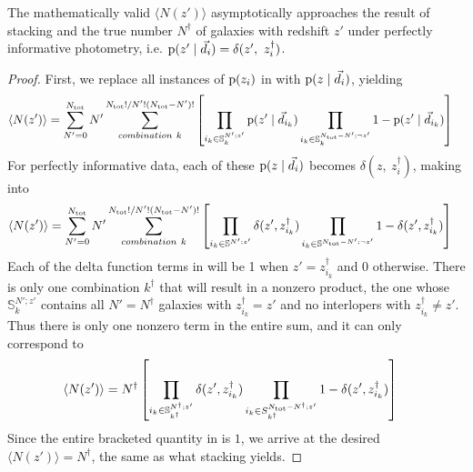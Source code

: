\begin{theorem}
	\label{thm:informative}
	The mathematically valid $\langle N(z') \rangle$ asymptotically approaches the result of stacking and the true number $N^{\dagger}$ of galaxies with redshift $z'$ under perfectly informative photometry, i.e. $\pr{z' \gvn \data_{i}} = \delta(z',\ z^{\dagger}_{i})$.
\end{theorem}
\begin{proof}
	First, we replace all instances of $\mathrm{p}(z_{i})$ in  with $\mathrm{p}(z \mid \vec{d}_{i})$, yielding
	\begin{align}
	\eqlabel{eqn:proofwithdata1}
	\langle N(z') \rangle &= \sum_{N' = 0}^{\ntot} N' \sum_{combination\ k}^{\ntot! / N'! (\ntot - N')!} \left[ \prod_{i_{k} \in \mathbb{S}^{N'; z'}_{k}} \pr{z' \gvn \data_{i_{k}}} \prod_{i_{k} \in \mathbb{S}^{\ntot - N'; \lnot z'}_{k}} 1 - \pr{z' \gvn \data_{i_{k}}} \right]
	\end{align}
	For perfectly informative data, each of these $\mathrm{p}(z \mid \vec{d}_{i})$ becomes $\delta(z,\ z^{\dagger}_{i})$, making  into
	\begin{align}
	\eqlabel{eqn:proofwithdata2}
	\langle N(z') \rangle &= \sum_{N' = 0}^{\ntot} N' \sum_{combination\ k}^{\ntot! / N'! (\ntot - N')!} \left[ \prod_{i_{k} \in \mathbb{S}^{N'; z'}} \delta(z', z^{\dagger}_{i_{k}}) \prod_{i_{k} \in \mathbb{S}^{\ntot - N'; \lnot z'}} 1 - \delta(z', z^{\dagger}_{i_{k}}) \right]
	\end{align}
	Each of the delta function terms in  will be 1 when $z' = z^{\dagger}_{i_{k}}$ and 0 otherwise.
	There is only one combination $k^{\dagger}$ that will result in a nonzero product, the one whose $\mathbb{S}^{N'; z'}_{k}$ contains all $N' = N^{\dagger}$ galaxies with $z^{\dagger}_{i_{k}} = z'$ and no interlopers with $z^{\dagger}_{i_{k}} \neq z'$.
	Thus there is only one nonzero term in the entire sum, and it can only correspond to 
	\begin{align}
	\eqlabel{eqn:proofwithdata3}
	\langle N(z') \rangle &= N^{\dagger} \left[ \prod_{i_{k} \in \mathbb{S}^{N^{\dagger}; z'}_{k^{\dagger}}} \delta(z', z^{\dagger}_{i_{k}}) \prod_{i_{k} \in S^{\ntot - N^{\dagger}; z'}_{k^{\dagger}}} 1 - \delta(z', z^{\dagger}_{i_{k}}) \right]
	\end{align}
	Since the entire bracketed quantity in  is $1$, we arrive at the desired $\langle N(z') \rangle = N^{\dagger}$, the same as what stacking yields.
\end{proof}

